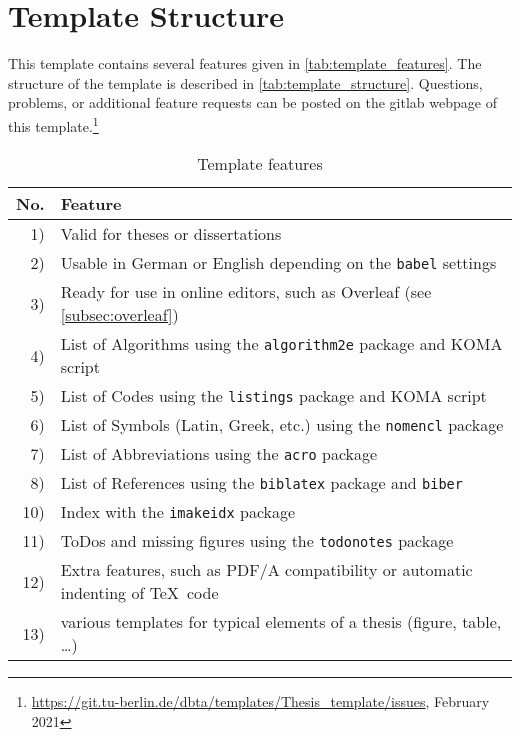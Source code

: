 \section{Template Structure}
This template contains several features given in \autoref{tab:template_features}. The structure of the template is described in \autoref{tab:template_structure}. Questions, problems, or additional feature requests can be posted on the gitlab webpage of this template.\footnote{\url{https://git.tu-berlin.de/dbta/templates/Thesis_template/issues}, February 2021}
\begin{table}
\centering
\caption{Template features}\label{tab:template_features}
\begin{tabular}{rp{}}
\toprule
No. & Feature \\
\midrule
	1) & Valid for theses or dissertations \\
	2) & Usable in German or English depending on the \verb+babel+\index{Packages!babel@\verb+babel+} settings \\
	3) & Ready for use in online editors, such as Overleaf (see \autoref{subsec:overleaf}) \\
	4) & List of Algorithms using the \verb+algorithm2e+\index{Packages!algorithm2e@\verb+algorithm2e+} package and KOMA script \\
	5) & List of Codes using the \verb+listings+\index{Packages!listings@\verb+listings+} package and KOMA script \\
	6) & List of Symbols (Latin, Greek, etc.) using the \verb+nomencl+\index{Packages!nomencl@\verb+nomencl+} package \\
	7) & List of Abbreviations using the \verb+acro+\index{Packages!acro@\verb+acro+} package \\
	8) & List of References using the \verb+biblatex+\index{Packages!biblatex@\verb+biblatex+} package and \verb+biber+\index{Scripts!biber@\verb+biber+} \\
	10) & Index with the \verb+imakeidx+\index{Packages!imakeidx@\verb+imakeidx+} package \\
	11) & ToDos and missing figures using the \verb+todonotes+\index{Packages!todonotes@\verb+todonotes+} package \\
	12) & Extra features, such as PDF/A compatibility or automatic indenting of \TeX\ code \\
	13) & various templates for typical elements of a thesis (figure, table, \dots) \\
	\bottomrule
\end{tabular}
\end{table}

